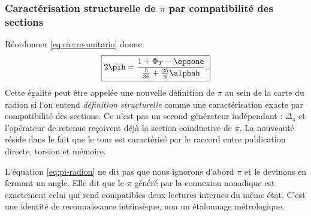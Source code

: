 \subsubsection{Caractérisation structurelle de \(\pi\) par compatibilité des sections}

Réordonner \eqref{eq:cierre-unitario} donne
\begin{equation}
\boxed{
2\pih=
\frac{1+\Phi_T-\epsone}
{\frac5{36}+\frac{25}{9}\alphah}.}
\label{eq:pi-radion}
\end{equation}
Cette égalité peut être appelée une nouvelle définition de \(\pi\) au sein de la
carte du radion si l'on entend \emph{définition structurelle} comme une
caractérisation exacte par compatibilité des sections. Ce n'est pas un second
générateur indépendant : \(\Delta_4\) et l'opérateur de retenue reçoivent déjà la
section coinductive de \(\pi\). La nouveauté réside dans le fait que le tour est
caractérisé par le raccord entre publication directe, torsion et mémoire.

\begin{narrativebox}
L'équation \eqref{eq:pi-radion} ne dit pas que nous ignorons d'abord \(\pi\) et
le devinons en fermant un angle. Elle dit que le \(\pi\) généré par la connexion
nonadique est exactement celui qui rend compatibles deux lectures internes du
même état. C'est une identité de reconnaissance intrinsèque, non un
étalonnage métrologique.
\end{narrativebox}
